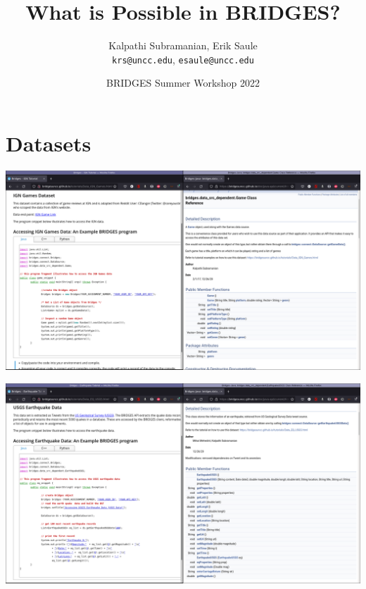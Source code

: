 \documentclass[aspectratio=169]{beamer}
\title{What is Possible in BRIDGES?}
\subtitle{}
\author{Kalpathi Subramanian, Erik Saule\\\texttt{krs@uncc.edu}, \texttt{esaule@uncc.edu}}
\institute{The University of North Carolina at Charlotte}
\date{BRIDGES Summer Workshop 2022}
\begin{document}
\begin{frame}
\titlepage
\end{frame}



\section{Datasets}

\begin{frame}
  \includegraphics[width=1.02\linewidth]{dataset_figs/DatasetGame.png}
\end{frame}

\begin{frame}
  \includegraphics[width=1.02\linewidth]{dataset_figs/Earthquake.png}
\end{frame}
\end{document}
